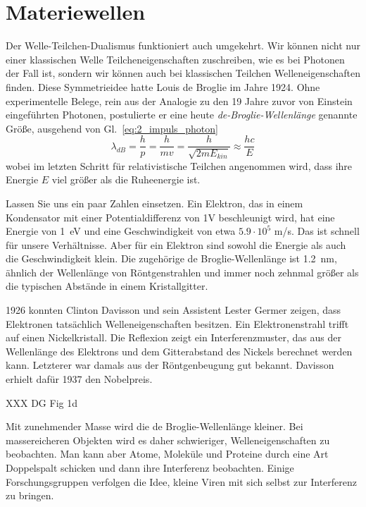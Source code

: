  \section{Materiewellen}

 Der Welle-Teilchen-Dualismus funktioniert auch umgekehrt. Wir können nicht nur einer klassischen Welle Teilcheneigenschaften zuschreiben, wie es bei Photonen der Fall ist, sondern wir können auch bei klassischen Teilchen Welleneigenschaften finden. Diese Symmetrieidee hatte Louis de Broglie im Jahre 1924. Ohne experimentelle Belege, rein aus der Analogie zu den 19 Jahre zuvor von Einstein eingeführten Photonen, postulierte er eine heute \emph{de-Broglie-Wellenlänge} genannte Größe, ausgehend von Gl.~\ref{eq:2_impuls_photon}
 \begin{equation}
     \lambda_{dB} = \frac{h}{p} = \frac{h}{m v} = \frac{h}{\sqrt{2 m E_{kin}}} \approx \frac{h c}{E}
 \end{equation}
 wobei im letzten Schritt für relativistische Teilchen angenommen wird, dass ihre Energie $E$ viel größer als die Ruheenergie ist.
 
 
 Lassen Sie uns ein paar Zahlen einsetzen. Ein Elektron, das in einem Kondensator mit einer Potentialdifferenz von \si{1}{V} beschleunigt wird, hat eine Energie von 1~eV und eine Geschwindigkeit von etwa $5.9 \cdot 10^5$ m/s. Das ist schnell für unsere Verhältnisse. Aber für ein Elektron sind sowohl die Energie als auch die Geschwindigkeit klein. Die zugehörige de Broglie-Wellenlänge ist 1.2~nm, ähnlich der Wellenlänge von Röntgenstrahlen und immer noch zehnmal größer als die typischen Abstände in einem Kristallgitter.

 1926 konnten Clinton Davisson und sein Assistent Lester Germer zeigen, dass Elektronen tatsächlich Welleneigenschaften besitzen.
 Ein Elektronenstrahl trifft auf einen Nickelkristall. Die Reflexion zeigt ein Interferenzmuster, das aus der Wellenlänge des Elektrons und dem Gitterabstand des Nickels berechnet werden kann. Letzterer war damals aus der Röntgenbeugung gut bekannt. Davisson erhielt dafür 1937 den Nobelpreis.
 
 XXX DG Fig 1d

 Mit zunehmender Masse wird die de Broglie-Wellenlänge kleiner. Bei massereicheren Objekten wird es daher schwieriger, Welleneigenschaften zu beobachten. Man kann aber Atome, Moleküle und Proteine durch eine Art Doppelspalt schicken und dann ihre Interferenz beobachten. Einige Forschungsgruppen verfolgen die Idee, kleine Viren mit sich selbst zur Interferenz zu bringen.


